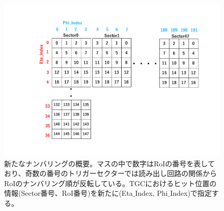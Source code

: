 \begin{figure}[tb]
  \centering
  \hspace*{-1cm}
  \includegraphics[clip, width=14cm]{fig/4/new_numbering.pdf}
  \caption{新たなナンバリングの概要。マスの中で数字はRoIの番号を表しており、奇数の番号のトリガーセクターでは読み出し回路の関係からRoIのナンバリング順が反転している。TGCにおけるヒット位置の情報(Sector番号、RoI番号)を新たに(Eta$\_$Index, Phi$\_$Index)で指定する。}
  \label{fig:newnumbering}
\end{figure}



